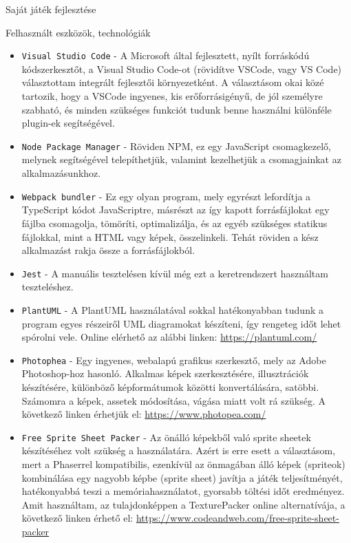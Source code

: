 \begin{MyChapter}{Saját játék fejlesztése}
\begin{MySection}{Felhasznált eszközök, technológiák}
\begin{itemize}
			\item \texttt{Visual Studio Code} - A Microsoft által fejlesztett, nyílt forráskódú kódszerkesztőt, a Visual Studio Code-ot (rövidítve VSCode, vagy VS Code) választottam integrált fejlesztői környezetként. A választásom okai közé tartozik, hogy a VSCode ingyenes, kis erőforrásigényű, de jól személyre szabható, és minden szükséges funkciót tudunk benne használni különféle plugin-ek segítségével.
			
			\item \texttt{Node Package Manager} - Röviden NPM, ez egy JavaScript csomagkezelő, melynek segítségével telepíthetjük, valamint kezelhetjük a csomagjainkat az alkalmazásunkhoz.
			
			\item \texttt{Webpack bundler} - Ez egy olyan program, mely egyrészt lefordítja a TypeScript kódot JavaScriptre, másrészt az így kapott forrásfájlokat egy fájlba csomagolja, tömöríti, optimalizálja, és az egyéb szükséges statikus fájlokkal, mint a HTML vagy képek, összelinkeli. Tehát röviden a kész alkalmazást rakja össze a forrásfájlokból.
			
			\item \texttt{Jest} - A manuális tesztelésen kívül még ezt a keretrendszert használtam teszteléshez.
			
			\item \texttt{PlantUML} - A PlantUML használatával sokkal hatékonyabban tudunk a program egyes részeiről UML diagramokat készíteni, így rengeteg időt lehet spórolni vele. Online elérhető az alábbi linken: \url{https://plantuml.com/}
			                                                                                 
			\item \texttt{Photophea} - Egy ingyenes, webalapú grafikus szerkesztő, mely az Adobe Photo\-shop-hoz hasonló. Alkalmas képek szerkesztésére, illusztrációk készítésére, különböző képformátumok közötti konvertálására, satöbbi.
			Számomra a képek, assetek módosítása, vágása miatt volt rá szükség.
			A következő linken érhetjük el: \url{https://www.photopea.com/}
			
			\item \texttt{Free Sprite Sheet Packer} - Az önálló képekből való sprite sheetek készítéséhez volt szükség a használatára. Azért is erre esett a választásom, mert a Phaserrel kompatibilis, ezenkívül az önmagában álló képek (spriteok) kombinálása egy nagyobb képbe (sprite sheet) javítja a játék teljesítményét, hatékonyabbá teszi a memóriahasználatot, gyorsabb töltési időt eredményez.
			\cite{spritesheet}
			Amit használtam, az tulajdonképpen a TexturePacker online alternatívája, a következő linken érhető el: \url{https://www.codeandweb.com/free-sprite-sheet-packer}
			

\end{itemize}
\end{MySection}
\end{MyChapter}
